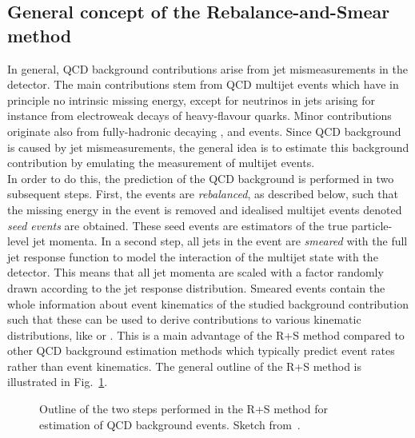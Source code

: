 \subsection{General concept of the Rebalance-and-Smear method}
\label{subsec:RPlusS_concept} 
In general, QCD background contributions arise from jet mismeasurements in the detector. The main contributions stem from QCD multijet events which have in principle no intrinsic missing energy, except for neutrinos in jets arising for instance from electroweak decays of heavy-flavour quarks. Minor contributions originate also from fully-hadronic decaying \ttbar, \WJets and \ZJets events. Since QCD background is caused by jet mismeasurements, the general idea is to estimate this background contribution by emulating the measurement of multijet events. \\
In order to do this, the prediction of the QCD background is performed in two subsequent steps. First, the events are \textit{rebalanced}, as described below, such that the missing energy in the event is removed and idealised multijet events denoted \textit{seed events} are obtained. These seed events are estimators of the true particle-level jet momenta. In a second step, all jets in the event are \textit{smeared} with the full jet response function to model the interaction of the multijet state with the detector. This means that all jet momenta are scaled with a factor randomly drawn according to the jet response distribution. Smeared events contain the whole information about event kinematics of the studied background contribution such that these can be used to derive contributions to various kinematic distributions, like \HT or \MHT. This is a main advantage of the R+S method compared to other QCD background estimation methods which typically predict event rates rather than event kinematics. The general outline of the R+S method is illustrated in Fig.~\ref{fig:RPlusS_concept}.
\begin{figure}[!t]
  \centering
  \caption{Outline of the two steps performed in the R+S method for estimation of QCD background events. Sketch from~\cite{thesis:Schroeder}.}
  \label{fig:RPlusS_concept}
\end{figure}

